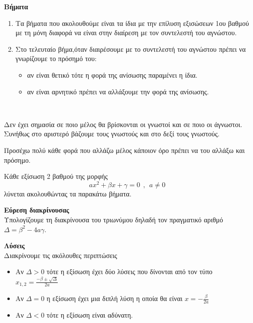 \begin{Methodos}{9cm}
\textbf{Βήματα}
\begin{enumerate}[itemsep=0mm]
\item Τα βήματα που ακολουθούμε είναι τα ίδια με την επίλυση εξισώσεων 1ου βαθμού με τη μόνη διαφορά να είναι στην διαίρεση με τον συντελεστή του αγνώστου.
\item Στο τελευταίο βήμα,όταν διαιρέσουμε με το συντελεστή του αγνώστου πρέπει να γνωρίζουμε το πρόσημό του:
\begin{itemize}
\item αν είναι θετικό τότε η φορά της ανίσωσης παραμένει η ίδια.
\item αν είναι αρνητικό πρέπει να αλλάξουμε την φορά της ανίσωσης.
\end{itemize}
\end{enumerate}
\end{Methodos}
\lysh\\
\begin{parat}{5cm}
Δεν έχει σημασία σε ποιο μέλος θα βρίσκονται οι γνωστοί και σε ποιο οι άγνωστοι. Συνήθως στο αριστερό βάζουμε τους γνωστούς και στο δεξί τους γνωστούς.
\end{parat}
\begin{prosoxi}{5cm}
Προσέχω πολύ κάθε φορά που αλλάζω μέλος κάποιον όρο πρέπει να του αλλάξω και πρόσημο.
\end{prosoxi}
\begin{Methodos}{9cm}
Κάθε εξίσωση 2 βαθμού της μορφής 
\[ ax^2+\beta x+\gamma=0\ \ ,\ \ a\neq 0 \]
λύνεται ακολουθώντας τα παρακάτω βήματα.
\begin{bhma}
\item\textbf{Εύρεση διακρίνουσας}\\
Υπολογίζουμε τη διακρίνουσα του τριωνύμου δηλαδή τον πραγματικό αριθμό $ \varDelta=\beta^2-4a\gamma $.
\item\textbf{Λύσεις}\\
Διακρίνουμε τις ακόλουθες περιπτώσεις
\begin{itemize}
\item Αν $ \varDelta>0 $ τότε η εξίσωση έχει δύο λύσεις που δίνονται από τον τύπο $ x_{1,2}=\frac{-\beta\pm\sqrt{\varDelta}}{2a} $
\item Αν $ \varDelta=0 $ η εξίσωση έχει μια διπλή λύση η οποία θα είναι
$ x=-\frac{\beta}{2a} $
\item Αν $ \varDelta<0 $ τότε η εξίσωση είναι αδύνατη.
\end{itemize}
\end{bhma}
\end{Methodos}
